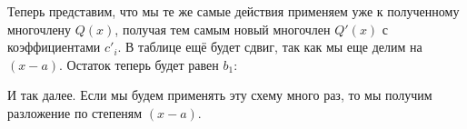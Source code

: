 \documentclass[russian]{lecture-notes}
\theoremstyle{definition}
\begin{document}
	Теперь представим, что мы те же самые действия применяем уже к полученному многочлену $Q(x)$, получая тем самым новый многочлен $Q'(x)$ с коэффициентами $c'_i$. В таблице ещё будет сдвиг, так как мы еще делим на $(x-a)$. Остаток теперь будет равен $b_1$:
	
	\begin{table}[H]
		\centering
	\end{table}

	И так далее. Если мы будем применять эту схему много раз, то мы получим разложение по степеням $(x-a)$.
	
\end{document}
